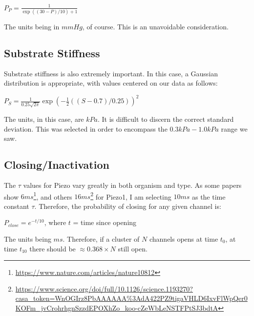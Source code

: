 \documentclass[12pt]{amsart}
\begin{document}
\bigskip
\begin{center}

    $P_P = \frac{1}{\exp((30 - P)/10) + 1}$
    
\end{center}

\bigskip

The units being in $mmHg$, of course. This is an unavoidable consideration. 

\subsection{Substrate Stiffness} Substrate stiffness is also extremely important. In this case, a Gaussian distribution is appropriate, with values centered on our data as follows: 

\bigskip

\begin{center}

    $P_S = \frac{1}{0.25\sqrt{2 \pi}}\exp(-\frac{1}{2}((S - 0.7)/0.25))^2$
    
\end{center}

\bigskip

The units, in this case, are $kPa$. It is difficult to discern the correct standard deviation. This was selected in order to encompass the $0.3kPa-1.0kPa$ range we saw. 

\subsection{Closing/Inactivation} The $\tau$ values for Piezo vary greatly in both organism and type. As some papers show $6ms$\footnote{\url{https://www.nature.com/articles/nature10812}}, and others $16ms$\footnote{\url{https://www.science.org/doi/full/10.1126/science.1193270?casa_token=WnOGIrz8PbAAAAAA\%3AdA422PZ9tigaVHLD6IxvFlWpQer0KOFm_jvCrohrhgnSzzdEPOXhZo_koo-cZeWbLeNSTFPtSJ3bdtA}} for Piezo1, I am selecting $10ms$ as the time constant $\tau$. Therefore, the probability of closing for any given channel is: 

\bigskip

\begin{center}

$P_{close} = e^{-t/10}$, where $t$ = time since opening

\end{center}

\bigskip

The units being $ms$. Therefore, if a cluster of $N$ channels opens at time $t_0$, at time $t_{10}$ there should be $\approx 0.368 \times N$ still open.  
\end{document}
